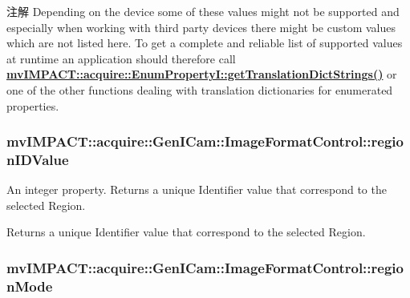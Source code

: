 \begin{DoxyNote}{注解}
Depending on the device some of these values might not be supported and especially when working with third party devices there might be custom values which are not listed here. To get a complete and reliable list of supported values at runtime an application should therefore call {\bfseries \hyperlink{classmv_i_m_p_a_c_t_1_1acquire_1_1_enum_property_i_a0ba6ccbf5ee69784d5d0b537924d26b6}{mv\+I\+M\+P\+A\+C\+T\+::acquire\+::\+Enum\+Property\+I\+::get\+Translation\+Dict\+Strings()}} or one of the other functions dealing with translation dictionaries for enumerated properties. 
\end{DoxyNote}
\hypertarget{classmv_i_m_p_a_c_t_1_1acquire_1_1_gen_i_cam_1_1_image_format_control_a25e094bef27e094cac127f308dae8407}{
\subsubsection[{region\+I\+D\+Value}]{ mv\+I\+M\+P\+A\+C\+T\+::acquire\+::\+Gen\+I\+Cam\+::\+Image\+Format\+Control\+::region\+I\+D\+Value}}\label{classmv_i_m_p_a_c_t_1_1acquire_1_1_gen_i_cam_1_1_image_format_control_a25e094bef27e094cac127f308dae8407}


An integer property. Returns a unique Identifier value that correspond to the selected Region. 

Returns a unique Identifier value that correspond to the selected Region. \hypertarget{classmv_i_m_p_a_c_t_1_1acquire_1_1_gen_i_cam_1_1_image_format_control_ad297d28dbc9bcd73a6f6af1ddaff8b6f}{
\subsubsection[{region\+Mode}]{ mv\+I\+M\+P\+A\+C\+T\+::acquire\+::\+Gen\+I\+Cam\+::\+Image\+Format\+Control\+::region\+Mode}}\label{classmv_i_m_p_a_c_t_1_1acquire_1_1_gen_i_cam_1_1_image_format_control_ad297d28dbc9bcd73a6f6af1ddaff8b6f}


